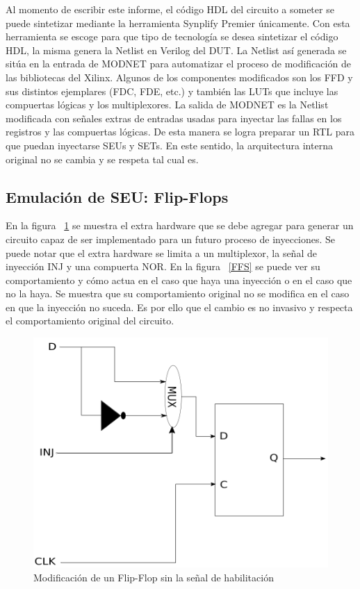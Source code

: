 Al momento de escribir este informe, el código HDL del circuito a someter se puede sintetizar mediante la herramienta Synplify Premier únicamente. Con esta herramienta se escoge para que tipo de tecnología se desea sintetizar el código HDL, la misma genera la Netlist en Verilog del DUT. La Netlist así generada se sitúa en la entrada de MODNET para automatizar el proceso de modificación de las bibliotecas del Xilinx. Algunos de los componentes modificados son los FFD y sus distintos ejemplares (FDC, FDE, etc.) y también las LUTs que incluye las compuertas lógicas y los multiplexores.
La salida de MODNET es la Netlist modificada con  señales extras de entradas usadas para inyectar las fallas en los registros y las compuertas lógicas. De esta manera se logra preparar un RTL para que puedan inyectarse SEUs y SETs. En este sentido, la arquitectura interna original no se cambia y se respeta tal cual es. 


\subsection{Emulación de SEU: Flip-Flops}
En la figura ~\ref{FF} se muestra el extra hardware que se debe agregar para generar un circuito capaz de ser implementado para un futuro proceso de inyecciones. Se puede notar que el extra hardware se limita a un multiplexor, la señal de inyección INJ y una compuerta NOR.
En la figura ~\ref{FFS} se puede ver su comportamiento y cómo  actua en el caso que haya una inyección o en el caso que no la haya. Se muestra que su comportamiento original no se modifica en el caso en que la inyección  no suceda. Es por ello que el cambio es no invasivo y respecta el comportamiento original del circuito.


\begin{figure}[H]
	\centering
	\includegraphics[width=0.55 \textwidth]{img/FF.png}
	\caption{Modificación de un Flip-Flop sin la señal de habilitación}
	\label{FF}
\end{figure}

